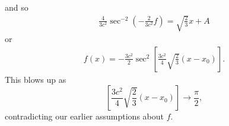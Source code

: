 \documentclass[12pt,reqno]{amsart}
\numberwithin{equation}{section}  %
\begin{document}
%
%
and so
%
%
\begin{equation*}
\begin{split}
 \frac{4}{3c^{2}} \sec^{-2}\left (-\frac{2}{3c^{2}}f \right )
= \sqrt{\frac{2}{3}}
x + A
\end{split}
\end{equation*}
%
or
%
%
\begin{equation*}
\begin{split}
  f(x) = -\frac{3c^{2}}{2} \sec^{2}\left[ \frac{3c^{2}}{4} \sqrt{\frac{2}{3}} \left (x
  - x_{0} \right)\right].
\end{split}
\end{equation*}
%
%
This blows up as $$ \left[ \frac{3c^{2}}{4} \sqrt{\frac{2}{3}} (x-x_{0})
\right] \to \frac{\pi}{2},$$
%
contradicting our earlier assumptions about $f$. 
%
\end{document}
